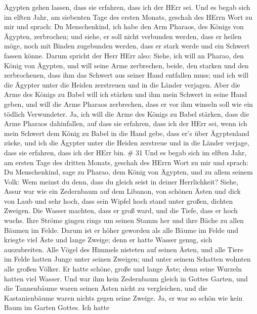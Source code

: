 Ägypten gehen lassen, dass sie erfahren, dass ich der HErr sei.
 Und es begab sich im elften Jahr, am siebenten Tage des
ersten Monats, geschah des HErrn Wort zu mir und sprach: 
Du Menschenkind, ich habe den Arm Pharaos, des Königs von Ägypten,
zerbrochen; und siehe, er soll nicht verbunden werden, dass er heilen
möge, noch mit Binden zugebunden werden, dass er stark werde und ein
Schwert fassen könne.  Darum spricht der Herr HErr also:
Siehe, ich will an Pharao, den König von Ägypten, und will seine Arme
zerbrechen, beide, den starken und den zerbrochenen, dass ihm das
Schwert aus seiner Hand entfallen muss;  und ich will die
Ägypter unter die Heiden zerstreuen und in die Länder verjagen.
 Aber die Arme des Königs zu Babel will ich stärken und ihm
mein Schwert in seine Hand geben, und will die Arme Pharaos zerbrechen,
dass er vor ihm winseln soll wie ein tödlich Verwundeter. 
Ja, ich will die Arme des Königs zu Babel stärken, dass die Arme Pharaos
dahinfallen, auf dass sie erfahren, dass ich der HErr sei, wenn ich mein
Schwert dem König zu Babel in die Hand gebe, dass er's über Ägyptenland
zücke,  und ich die Ägypter unter die Heiden zerstreue und
in die Länder verjage, dass sie erfahren, dass ich der HErr bin. \# 31
 Und es begab sich im elften Jahr, am ersten Tage des
dritten Monats, geschah des HErrn Wort zu mir und sprach: 
Du Menschenkind, sage zu Pharao, dem König von Ägypten, und zu allem
seinem Volk: Wem meinst du denn, dass du gleich seist in deiner
Herrlichkeit?  Siehe, Assur war wie ein Zedernbaum auf dem
Libanon, von schönen Ästen und dick von Laub und sehr hoch, dass sein
Wipfel hoch stand unter großen, dichten Zweigen.  Die Wasser
machten, dass er groß ward, und die Tiefe, dass er hoch wuchs. Ihre
Ströme gingen rings um seinen Stamm her und ihre Bäche zu allen Bäumen
im Felde.  Darum ist er höher geworden als alle Bäume im
Felde und kriegte viel Äste und lange Zweige; denn er hatte Wasser
genug, sich auszubreiten.  Alle Vögel des Himmels nisteten
auf seinen Ästen, und alle Tiere im Felde hatten Junge unter seinen
Zweigen; und unter seinem Schatten wohnten alle großen Völker.
 Er hatte schöne, große und lange Äste; denn seine Wurzeln
hatten viel Wasser.  Und war ihm kein Zedernbaum gleich in
Gottes Garten, und die Tannenbäume waren seinen Ästen nicht zu
vergleichen, und die Kastanienbäume waren nichts gegen seine Zweige. Ja,
er war so schön wie kein Baum im Garten Gottes.  Ich hatte
